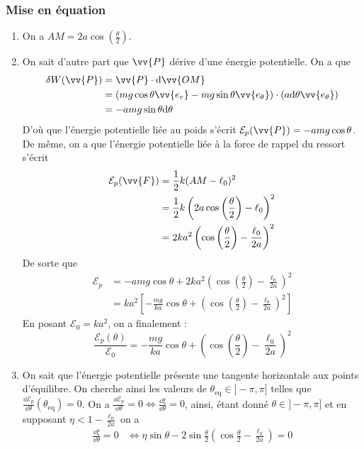 \documentclass[17pt]{article}
\newcommand{\dW}[1]{\delta W(\vv{#1})}
\def\Ep{\mathcal{E}_p}
\def\ssi{\Leftrightarrow}
\begin{document}
	\subsubsection*{Mise en équation}
	\begin{enumerate}[start=4]
		\item On a $\boxed{AM=2a\cos\left(\frac\theta2\right)}$.
		\item On sait d'autre part que $\vv{P}$ dérive d'une énergie potentielle. On a que
		\begin{align*}
			\dW{P} &= \vv{P}\cdot \dd \vv{OM}\\
					 &= \left(mg\cos\theta\vv{e_r}-mg\sin\theta\vv{e_\theta}\right)\cdot(a\dd\theta\vv{e_\theta})\\
					 &= -amg\sin\theta\dd \theta
		\end{align*}
		D'où que l'énergie potentielle liée au poids s'écrit $\Ep(\vv{P})=-amg\cos\theta$. De même, on a que l'énergie potentielle liée à la force de rappel du ressort s'écrit 
		\begin{align*}
			\Ep(\vv{F}) &= \frac12k(AM-\ell_0)^2\\
						&= \frac12k\left(2a\cos\left(\frac\theta2\right)-\ell_0\right)^2\\
						&=2ka^2\left(\cos\left(\frac\theta2\right)-\frac{\ell_0}{2a}\right)^2
		\end{align*}
		De sorte que 
		\begin{align*}
			\Ep &= -amg\cos\theta+2ka^2\left(\cos\left(\frac\theta2\right)-\frac{\ell_0}{2a}\right)^2\\
				&= ka^2\left[-\frac{mg}{ka}\cos\theta+\left(\cos\left(\frac\theta2\right)-\frac{\ell_0}{2a}\right)^2\right]
		\end{align*}
		En posant $\mathcal{E}_0=ka^2$, on a finalement : \[\boxed{\frac{\Ep(\theta)}{\mathcal{E}_0}=-\frac{mg}{ka}\cos\theta+\left(\cos\left(\frac\theta2\right)-\frac{\ell_0}{2a}\right)^2}\]
		\item On sait que l'énergie potentielle présente une tangente horizontale aux points d'équilibre. On cherche ainsi les valeurs de $\theta_{\text{eq}}\in]-\pi,\pi]$ telles que $\frac{\dd\Ep}{\dd\theta}(\theta_{\text{eq}})=0$. On a $\frac{\dd\Ep}{\dd\theta}=0\ssi\frac{\dd\xi}{\dd\theta}=0$, ainsi, étant donné $\theta\in]-\pi,\pi]$ et en supposant $\eta<1-\frac{\ell_0}{2a}$ on a 
		\begin{align*}
			\frac{\dd\xi}{\dd\theta}=0 &\ssi \eta\sin\theta-2\sin\frac\theta2\left(\cos\frac\theta2-\frac{\ell_0}{2a}\right)=0\\

\end{align*}
\end{enumerate}
\end{document}
